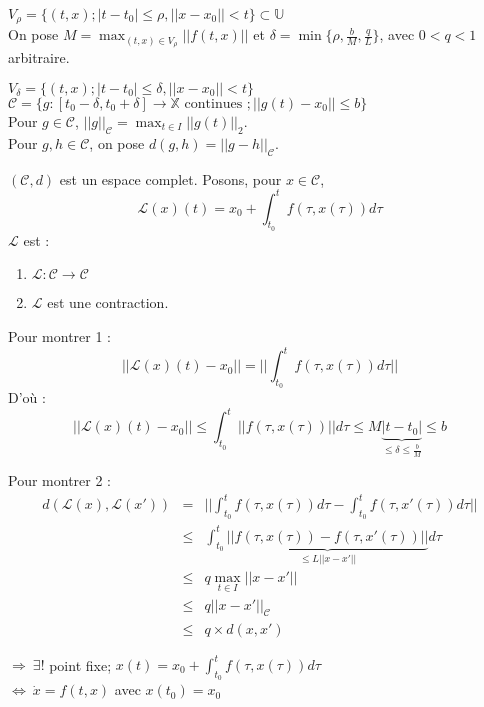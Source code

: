\begin{dem}
$V_{\rho}=\{(t,x); |t-t_0|\leq \rho, ||x-x_0|| < t\} \subset \mathbb{U}$\\ 
On pose $M=\max_{(t,x)\in V_{\rho}} ||f(t,x)||$ et $\delta=\min \{\rho, \frac{b}{M}, \frac{q}{L}\}$, avec $0<q<1$ arbitraire. 

\bigskip
$V_{\delta}=\{(t,x) ; |t-t_0|\leq \delta, ||x-x_0|| < t \}$\\
$\mathcal{C}=\{g : [t_0-\delta,t_0+\delta] \to \mathbb{X} \text{ continues }; ||g(t)-x_0||\leq b\}$ \\
Pour $g\in\mathcal{C}$, $||g||_{\mathcal{C}}=\max_{t\in I} ||g(t)||_2$. \\
Pour $g,h\in\mathcal{C}$, on pose $d(g,h)=||g-h||_{\mathcal{C}}$.

\bigskip
$(\mathcal{C},d)$ est un espace complet. Posons, pour $x\in\mathcal{C}$, 
\[\mathcal{L}(x)(t)=x_0 + \int_{t_0}^t f(\tau,x(\tau)) d\tau\]
$\mathcal{L}$ est : \begin{enumerate}
	\item $\mathcal{L}:\mathcal{C}\to\mathcal{C}$
	\item $\mathcal{L}$ est une contraction.
\end{enumerate}

Pour montrer 1 : \\
\[||\mathcal{L}(x)(t) - x_0|| = ||\int_{t_0}^t f(\tau,x(\tau)) d\tau ||\]
D'où :
\[||\mathcal{L}(x)(t) - x_0|| \leq \int_{t_0}^t ||f(\tau,x(\tau))|| d\tau \leq M\underbrace{|t-t_0|}_{\leq \delta \leq \frac{b}{M}}\leq b\]

Pour montrer 2 : \\
\begin{eqnarray*}
	d(\mathcal{L}(x),\mathcal{L}(x'))&=&||\int_{t_0}^t f(\tau,x(\tau)) d\tau - \int_{t_0}^t f(\tau,x'(\tau)) d\tau||\\
				      &\leq&\int_{t_0}^t \underbrace{||f(\tau,x(\tau)) - f(\tau,x'(\tau))||}_{\leq L||x-x'||} d\tau \\
			              &\leq&q \max_{t\in I}||x-x'|| \\
				      &\leq&q ||x-x'||_{\mathcal{C}} \\
				      &\leq&q\times d(x,x')
\end{eqnarray*}

\noindent $\Rightarrow\ \exists!$ point fixe; $x(t)=x_0 + \int_{t_0}^t f(\tau,x(\tau)) d\tau$ \\
$\Leftrightarrow\ \dot{x}=f(t,x)$ avec $x(t_0)=x_0$ 
\end{dem}

